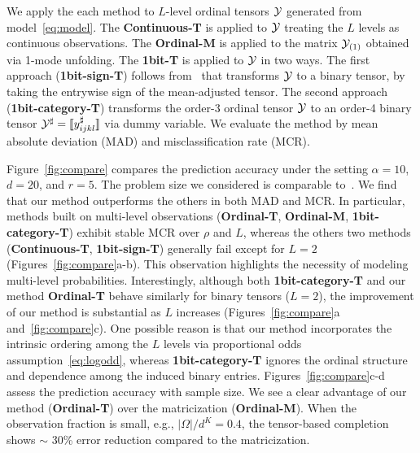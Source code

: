 \documentclass{article}
\theoremstyle{plain}
\theoremstyle{definition}
\begin{document}
We apply the each method to $L$-level ordinal tensors $\mathcal{Y}$ generated from model~\eqref{eq:model}. The {\bf Continuous-T} is applied to $\mathcal{Y}$ treating the $L$ levels as continuous observations. The {\bf Ordinal-M} is applied to the matrix $\mathcal{Y}_{(1)}$ obtained via 1-mode unfolding. The {\bf 1bit-T} is applied to $\mathcal{Y}$ in two ways. The first approach ({\bf 1bit-sign-T}) follows from~\citep{ghadermarzy2018learning} that transforms
$\mathcal{Y}$ to a binary tensor, by taking the entrywise sign of the mean-adjusted tensor. %
The second approach ({\bf 1bit-category-T}) transforms the order-3 ordinal tensor 
$\mathcal{Y}$ to an order-4 binary tensor $\mathcal{Y}^{\sharp}=\llbracket y^{\sharp}_{ijkl} \rrbracket$ via dummy variable.
We evaluate the method by mean absolute deviation (MAD) and misclassification rate (MCR).


Figure~\ref{fig:compare} compares the prediction accuracy under the setting $\alpha=10$, $d=20$, and $r=5$. The problem size we considered is comparable to~\citep{ghadermarzy2018learning}. We find that our method outperforms the others in both MAD and MCR. In particular, methods built on multi-level observations ({\bf Ordinal-T}, {\bf Ordinal-M}, {\bf 1bit-category-T}) exhibit stable MCR over $\rho$ and $L$, whereas the others two methods ({\bf Continuous-T}, {\bf 1bit-sign-T}) generally fail except for $L=2$ (Figures~\ref{fig:compare}a-b). This observation highlights the necessity of modeling multi-level probabilities.
Interestingly, although both {\bf 1bit-category-T} and our method {\bf Ordinal-T} behave similarly for binary tensors ($L=2$), the improvement of our method is substantial as $L$ increases (Figures~\ref{fig:compare}a and~\ref{fig:compare}c). One possible reason is that our method incorporates the intrinsic ordering among the $L$ levels via proportional odds assumption~\eqref{eq:logodd}, whereas {\bf 1bit-category-T} ignores the ordinal structure and dependence among the induced binary entries. Figures~\ref{fig:compare}c-d assess the prediction accuracy with sample size. We see a clear advantage of our method ({\bf Ordinal-T}) over the matricization ({\bf Ordinal-M}). When the observation fraction is small, e.g., ${|\Omega|/ d^K}=0.4$, the tensor-based completion shows $\sim$ 30\% error reduction  compared to the matricization.
\end{document}
